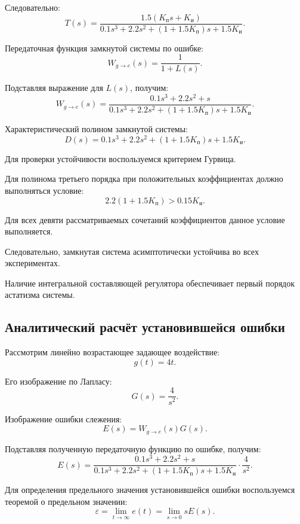 \documentclass[12pt, a4paper]{article}
\begin{document}
Следовательно:
\begin{equation}
    \boxed{
    T(s)=
    \frac{1.5(K_{\text{п}}s+K_{\text{и}})}
    {0.1s^3+2.2s^2+
    (1+1.5K_{\text{п}})s+1.5K_{\text{и}}}
    }.
\end{equation}

Передаточная функция замкнутой системы
по ошибке:
\[
    W_{g\to e}(s)=\frac{1}{1+L(s)}.
\]

Подставляя выражение для $L(s)$, получим:
\begin{equation}
    \boxed{
    W_{g\to e}(s)=
    \frac{0.1s^3+2.2s^2+s}
    {0.1s^3+2.2s^2+
    (1+1.5K_{\text{п}})s+1.5K_{\text{и}}}
    }.
\end{equation}

Характеристический полином замкнутой системы:
\[
    D(s)=0.1s^3+2.2s^2+
    (1+1.5K_{\text{п}})s+1.5K_{\text{и}}.
\]

Для проверки устойчивости воспользуемся
критерием Гурвица.

Для полинома третьего порядка при положительных
коэффициентах должно выполняться условие:
\[
    2.2(1+1.5K_{\text{п}})
    >0.15K_{\text{и}}.
\]

Для всех девяти рассматриваемых сочетаний
коэффициентов данное условие выполняется.

Следовательно, замкнутая система
асимптотически устойчива во всех экспериментах.

Наличие интегральной составляющей регулятора
обеспечивает первый порядок астатизма системы.


\subsection{Аналитический расчёт
установившейся ошибки}

Рассмотрим линейно возрастающее
задающее воздействие:
\[
    g(t)=4t.
\]

Его изображение по Лапласу:
\[
    G(s)=\frac{4}{s^2}.
\]

Изображение ошибки слежения:
\[
    E(s)=W_{g\to e}(s)G(s).
\]

Подставляя полученную передаточную функцию
по ошибке, получим:
\[
    E(s)=
    \frac{0.1s^3+2.2s^2+s}
    {0.1s^3+2.2s^2+
    (1+1.5K_{\text{п}})s+1.5K_{\text{и}}}
    \cdot\frac{4}{s^2}.
\]

Для определения предельного значения
установившейся ошибки воспользуемся
теоремой о предельном значении:
\[
    \varepsilon=
    \lim_{t\to\infty}e(t)
    =\lim_{s\to0}sE(s).
\]
\end{document}

